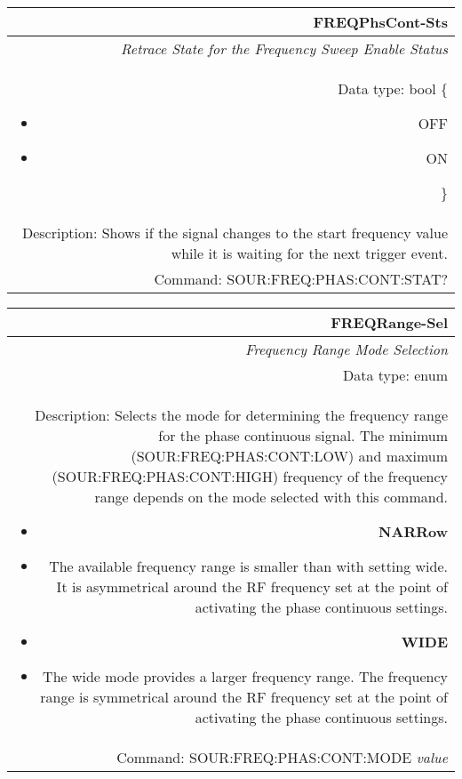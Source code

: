 \documentclass[openany]{article}
\begin{document}
		\begin{tabular}{N}
			\hline
			\bfseries FREQPhsCont-Sts \\ \hline
			\emph{Retrace State for the Frequency Sweep Enable Status} \\
			Data type: bool \{\begin{itemize}[noitemsep]
				\small
				\item[] OFF
				\item[] ON
			\end{itemize}\} \\
			Description: Shows if the signal changes to the start frequency value while it is waiting for the next trigger event. \\
			Command: SOUR:FREQ:PHAS:CONT:STAT? \\

		\end{tabular}
%
		\begin{tabular}{N}
			\hline
			\bfseries FREQRange-Sel \\ \hline
			\emph{Frequency Range Mode Selection} \\
			Data type: enum \\
			Description: Selects the mode for determining the frequency range for the phase continuous signal. The minimum (SOUR:FREQ:PHAS:CONT:LOW) and maximum (SOUR:FREQ:PHAS:CONT:HIGH) frequency of the frequency range depends on the mode selected with this command.\begin{itemize}[noitemsep]
				\small
				\item[] \textbf{NARRow}
				\item[] The available frequency range is smaller than with setting wide. It is asymmetrical around the RF frequency set at the point of activating the phase continuous settings.
				\item[] \textbf{WIDE}
				\item[] The wide mode provides a larger frequency range. The frequency range is symmetrical around the RF frequency set at the point of activating the phase continuous settings.
			\end{itemize} \\
			Command: SOUR:FREQ:PHAS:CONT:MODE \emph{value} \\

		\end{tabular}
\end{document}
